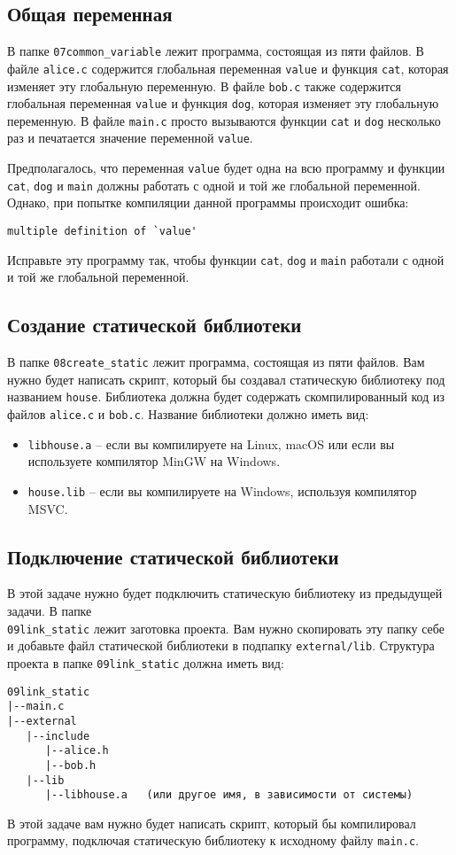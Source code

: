 \documentclass{article}
\begin{document}
\subsection{Общая переменная}
В папке \texttt{07common\_variable} лежит программа, состоящая из пяти файлов. В файле \texttt{alice.c} содержится глобальная переменная \texttt{value} и функция \texttt{cat}, которая изменяет эту глобальную переменную. В файле \texttt{bob.c} также содержится глобальная переменная \texttt{value} и функция \texttt{dog}, которая изменяет эту глобальную переменную. В файле \texttt{main.c} просто вызываются функции \texttt{cat} и \texttt{dog} несколько раз и печатается значение переменной \texttt{value}.

Предполагалось, что переменная \texttt{value} будет одна на всю программу и функции \texttt{cat}, \texttt{dog} и \texttt{main} должны работать с одной и той же глобальной переменной. Однако, при попытке компиляции данной программы происходит ошибка:
\begin{lstlisting}[style=csMiptBash]
 multiple definition of `value'
\end{lstlisting}
Исправьте эту программу так, чтобы функции \texttt{cat}, \texttt{dog} и \texttt{main} работали с одной и той же глобальной переменной.


\subsection{Создание статической библиотеки}
В папке \texttt{08create\_static} лежит программа, состоящая из пяти файлов. Вам нужно будет написать скрипт, который бы создавал статическую библиотеку под названием \texttt{house}. Библиотека должна будет содержать скомпилированный код из файлов \texttt{alice.c} и \texttt{bob.c}. Название библиотеки должно иметь вид:
\begin{itemize}
\item \texttt{libhouse.a} -- если вы компилируете на Linux, macOS или если вы используете компилятор MinGW на Windows.
\item \texttt{house.lib} -- если вы компилируете на Windows, используя компилятор MSVC.
\end{itemize}

\subsection{Подключение статической библиотеки}
В этой задаче нужно будет подключить статическую библиотеку из предыдущей задачи. В папке\\ \texttt{09link\_static} лежит заготовка проекта. Вам нужно скопировать эту папку себе и добавьте файл статической библиотеки в подпапку \texttt{external/lib}. Структура проекта в папке \texttt{09link\_static} должна иметь вид:
\begin{verbatim}
09link_static
|--main.c
|--external
   |--include
      |--alice.h
      |--bob.h
   |--lib
      |--libhouse.a   (или другое имя, в зависимости от системы)
\end{verbatim}
В этой задаче вам нужно будет написать скрипт, который бы компилировал программу, подключая статическую библиотеку к исходному файлу \texttt{main.c}.
\end{document}
